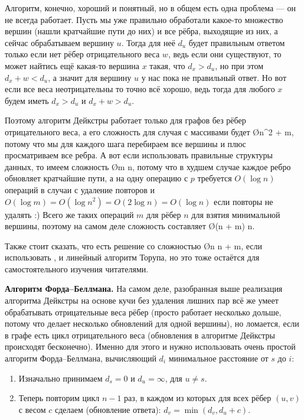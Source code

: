 Алгоритм, конечно, хороший и понятный, но в общем есть одна проблема — он не всегда работает. Пусть мы уже правильно обработали какое-то множество вершин (нашли кратчайшие пути до них) и все рёбра, выходящие из них, а сейчас обрабатываем вершину $u$. Тогда для неё $d_u$ будет правильным ответом только если нет рёбер отрицательного веса $w$, ведь если они существуют, то может найтись ещё какая-то вершина $x$ такая, что $d_x > d_u$, но при этом $d_x + w < d_u$, а значит для вершину $u$ у нас пока не правильный ответ. Но вот если все веса неотрицательны то точно всё хорошо, ведь тогда для любого $x$ будем иметь $d_x > d_u$ и $d_x + w > d_u$.

Поэтому алгоритм Дейкстры работает только для графов без рёбер отрицательного веса, а его сложность для случая с массивами будет \O{n^2 + m}, потому что мы для каждого шага перебираем все вершины и плюс просматриваем все ребра. А вот если использовать правильные структуры данных, то имеем сложность \O{m \log n}, потому что в худшем случае каждое ребро обновляет кратчайшие пути, а на одну операцию с $p$ требуется $O(\log n)$ операций в случаи с удаление повторов и $O(\log m) = O(\log n^2) = O(2 \log n) = O(\log n)$ если повторы не удалять :) Всего же таких операций $m$ для рёбер 
$n$ для взятия минимальной вершины, поэтому на самом деле сложность составляет \O{(n + m) \log n}.

Также стоит сказать, что есть решение со сложностью \O{n \log n + m}, если использовать , и линейный алгоритм Торупа, но это тоже остаётся для самостоятельного изучения читателями.

\textbf{Алгоритм Форда–Беллмана.} На самом деле, разобранная выше реализация алгоритма Дейкстры на основе кучи без удаления лишних пар всё же умеет обрабатывать отрицательные веса рёбер (просто работает несколько дольше, потому что делает несколько обновлений для одной вершины), но ломается, если в графе есть цикл отрицательного веса (обновления в алгоритме Дейкстры происходят бесконечно). Именно для этого и нужно использовать очень простой алгоритм Форда–Беллмана, вычисляющий $d_i$ минимальное расстояние от $s$ до $i$:

\begin{enumerate}
    \item Изначально принимаем $d_s = 0$ и $d_u = \infty$, для $u \ne s$.
    \item Теперь повторим цикл $n-1$ раз, в каждом из которых для всех рёбер $(u, v)$ с весом $c$ сделаем  (обновление ответа): $d_v = \min(d_v, d_u + c)$. 
\end{enumerate}

